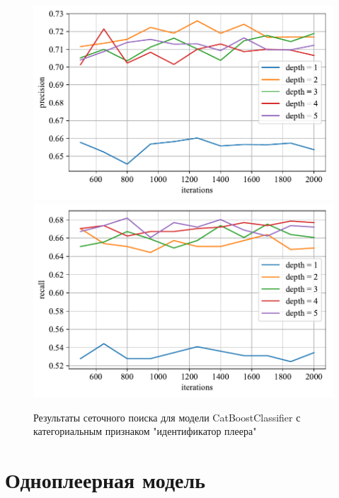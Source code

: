 \begin{figure}
    \centering
    \includegraphics{./images/toloka_catboost_with_cat_precision.pdf}
    \includegraphics{./images/toloka_catboost_with_cat_recall.pdf}
    \caption{Результаты сеточного поиска для модели CatBoostClassifier с  категориальным признаком "идентификатор плеера"}
    \label{fig:toloka_catboost_with_cat}
\end{figure}

\section{Одноплеерная модель}

